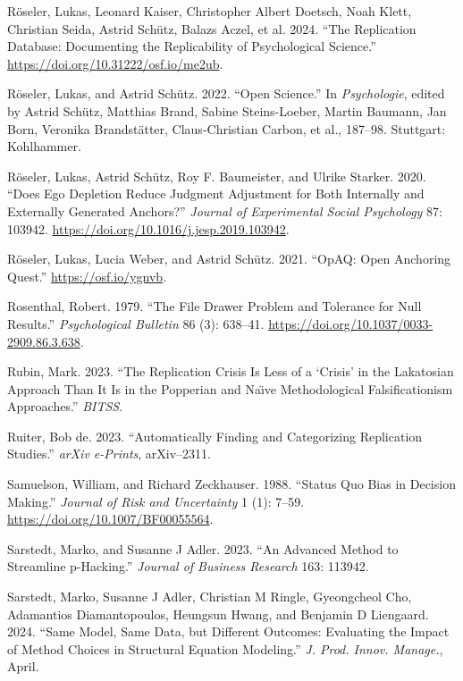 \documentclass[
  letterpaper,
  DIV=11,
  numbers=noendperiod]{scrreprt}
\newlength{\cslhangindent}
\newenvironment{CSLReferences}[2] %
 {\begin{list}{}{%
  \setlength{\itemindent}{0pt}
  \setlength{\leftmargin}{0pt}
  \setlength{\parsep}{0pt}
  \ifodd #1
   \setlength{\leftmargin}{\cslhangindent}
   \setlength{\itemindent}{-1\cslhangindent}
  \fi
  \setlength{\itemsep}{#2\baselineskip}}}
 {\end{list}}
\begin{document}
\begin{CSLReferences}{1}{0}
Röseler, Lukas, Leonard Kaiser, Christopher Albert Doetsch, Noah Klett,
Christian Seida, Astrid Schütz, Balazs Aczel, et al. 2024. {``The
Replication Database: Documenting the Replicability of Psychological
Science.''} \url{https://doi.org/10.31222/osf.io/me2ub}.

Röseler, Lukas, and Astrid Schütz. 2022. {``Open Science.''} In
\emph{Psychologie}, edited by Astrid Schütz, Matthias Brand, Sabine
Steins-Loeber, Martin Baumann, Jan Born, Veronika Brandstätter,
Claus-Christian Carbon, et al., 187--98. Stuttgart: Kohlhammer.

Röseler, Lukas, Astrid Schütz, Roy F. Baumeister, and Ulrike Starker.
2020. {``Does Ego Depletion Reduce Judgment Adjustment for Both
Internally and Externally Generated Anchors?''} \emph{Journal of
Experimental Social Psychology} 87: 103942.
\url{https://doi.org/10.1016/j.jesp.2019.103942}.

Röseler, Lukas, Lucia Weber, and Astrid Schütz. 2021. {``OpAQ: Open
Anchoring Quest.''} \url{https://osf.io/ygnvb}.

Rosenthal, Robert. 1979. {``The File Drawer Problem and Tolerance for
Null Results.''} \emph{Psychological Bulletin} 86 (3): 638--41.
\url{https://doi.org/10.1037/0033-2909.86.3.638}.

Rubin, Mark. 2023. {``The Replication Crisis Is Less of a {`Crisis'} in
the Lakatosian Approach Than It Is in the Popperian and Na{ı̈}ve
Methodological Falsificationism Approaches.''} \emph{BITSS}.

Ruiter, Bob de. 2023. {``Automatically Finding and Categorizing
Replication Studies.''} \emph{arXiv e-Prints}, arXiv--2311.

Samuelson, William, and Richard Zeckhauser. 1988. {``Status Quo Bias in
Decision Making.''} \emph{Journal of Risk and Uncertainty} 1 (1): 7--59.
\url{https://doi.org/10.1007/BF00055564}.

Sarstedt, Marko, and Susanne J Adler. 2023. {``An Advanced Method to
Streamline p-Hacking.''} \emph{Journal of Business Research} 163:
113942.

Sarstedt, Marko, Susanne J Adler, Christian M Ringle, Gyeongcheol Cho,
Adamantios Diamantopoulos, Heungsun Hwang, and Benjamin D Liengaard.
2024. {``Same Model, Same Data, but Different Outcomes: Evaluating the
Impact of Method Choices in Structural Equation Modeling.''} \emph{J.
Prod. Innov. Manage.}, April.


\end{CSLReferences}
\end{document}
